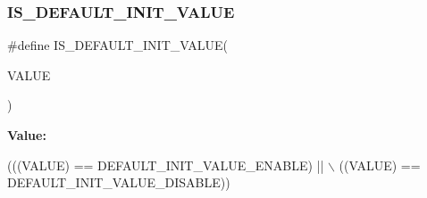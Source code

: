 \subsubsection{\texorpdfstring{I\+S\+\_\+\+D\+E\+F\+A\+U\+L\+T\+\_\+\+I\+N\+I\+T\+\_\+\+V\+A\+L\+UE}{IS\_DEFAULT\_INIT\_VALUE}}
{\footnotesize\ttfamily \#define I\+S\+\_\+\+D\+E\+F\+A\+U\+L\+T\+\_\+\+I\+N\+I\+T\+\_\+\+V\+A\+L\+UE(\begin{DoxyParamCaption}\item[{}]{V\+A\+L\+UE }\end{DoxyParamCaption})}

{\bfseries Value\+:}
\begin{DoxyCode}
(((VALUE) == DEFAULT\_INIT\_VALUE\_ENABLE) || \(\backslash\)
                                       ((VALUE) == DEFAULT\_INIT\_VALUE\_DISABLE))
\end{DoxyCode}

